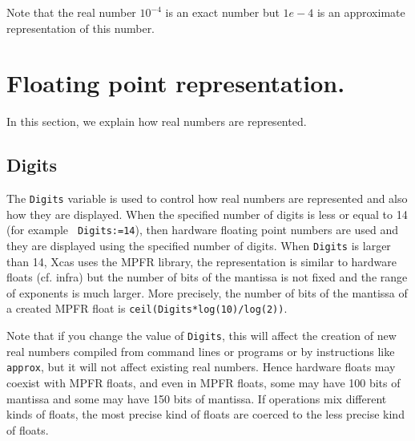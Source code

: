 \documentclass[a4paper,11pt]{book}
\begin{document}
Note that the real number $10^{-4}$ is an exact number but
$1e-4$ is an approximate representation of this number.

\section{Floating point representation.}
In this section, we explain how real numbers are represented.

\subsection{Digits}
The {\tt Digits} variable is used to control how real numbers
are represented and also how they are displayed.
When the specified
number of digits is less or equal to 14 (for example {\tt
  Digits:=14}), then hardware floating point
numbers are used and they are displayed using the specified
number of digits.
When {\tt Digits} is larger than 14, Xcas uses the MPFR
library, the representation is similar to hardware floats
(cf. infra) but the number of bits of
the mantissa is not fixed and the range of exponents is much larger.
More precisely, the number of bits of the mantissa of a created MPFR float
is {\tt ceil(Digits*log(10)/log(2))}.

Note that if you change the value of {\tt Digits}, this will affect
the creation of new real numbers compiled from command lines 
or programs or by instructions like {\tt approx}, but it will
not affect existing real numbers. Hence hardware floats may coexist
with MPFR floats, and even in MPFR floats, some may have 100 bits
of mantissa and some may have 150 bits of mantissa. If operations
mix different kinds of floats, the most precise kind of floats
are coerced to the less precise kind of floats.
\end{document}

